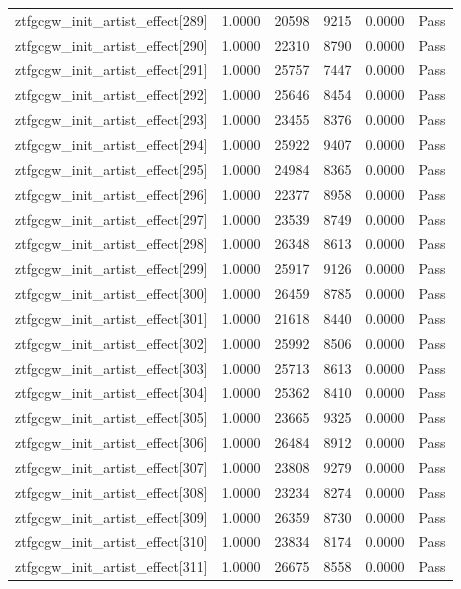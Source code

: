 \begin{table}[htbp]
\begin{tabular}{llrrll}
ztfgcgw\_init\_artist\_effect[289] & 1.0000 & 20598 & 9215 & 0.0000 & Pass \\
ztfgcgw\_init\_artist\_effect[290] & 1.0000 & 22310 & 8790 & 0.0000 & Pass \\
ztfgcgw\_init\_artist\_effect[291] & 1.0000 & 25757 & 7447 & 0.0000 & Pass \\
ztfgcgw\_init\_artist\_effect[292] & 1.0000 & 25646 & 8454 & 0.0000 & Pass \\
ztfgcgw\_init\_artist\_effect[293] & 1.0000 & 23455 & 8376 & 0.0000 & Pass \\
ztfgcgw\_init\_artist\_effect[294] & 1.0000 & 25922 & 9407 & 0.0000 & Pass \\
ztfgcgw\_init\_artist\_effect[295] & 1.0000 & 24984 & 8365 & 0.0000 & Pass \\
ztfgcgw\_init\_artist\_effect[296] & 1.0000 & 22377 & 8958 & 0.0000 & Pass \\
ztfgcgw\_init\_artist\_effect[297] & 1.0000 & 23539 & 8749 & 0.0000 & Pass \\
ztfgcgw\_init\_artist\_effect[298] & 1.0000 & 26348 & 8613 & 0.0000 & Pass \\
ztfgcgw\_init\_artist\_effect[299] & 1.0000 & 25917 & 9126 & 0.0000 & Pass \\
ztfgcgw\_init\_artist\_effect[300] & 1.0000 & 26459 & 8785 & 0.0000 & Pass \\
ztfgcgw\_init\_artist\_effect[301] & 1.0000 & 21618 & 8440 & 0.0000 & Pass \\
ztfgcgw\_init\_artist\_effect[302] & 1.0000 & 25992 & 8506 & 0.0000 & Pass \\
ztfgcgw\_init\_artist\_effect[303] & 1.0000 & 25713 & 8613 & 0.0000 & Pass \\
ztfgcgw\_init\_artist\_effect[304] & 1.0000 & 25362 & 8410 & 0.0000 & Pass \\
ztfgcgw\_init\_artist\_effect[305] & 1.0000 & 23665 & 9325 & 0.0000 & Pass \\
ztfgcgw\_init\_artist\_effect[306] & 1.0000 & 26484 & 8912 & 0.0000 & Pass \\
ztfgcgw\_init\_artist\_effect[307] & 1.0000 & 23808 & 9279 & 0.0000 & Pass \\
ztfgcgw\_init\_artist\_effect[308] & 1.0000 & 23234 & 8274 & 0.0000 & Pass \\
ztfgcgw\_init\_artist\_effect[309] & 1.0000 & 26359 & 8730 & 0.0000 & Pass \\
ztfgcgw\_init\_artist\_effect[310] & 1.0000 & 23834 & 8174 & 0.0000 & Pass \\
ztfgcgw\_init\_artist\_effect[311] & 1.0000 & 26675 & 8558 & 0.0000 & Pass \\

\end{tabular}
\end{table}
